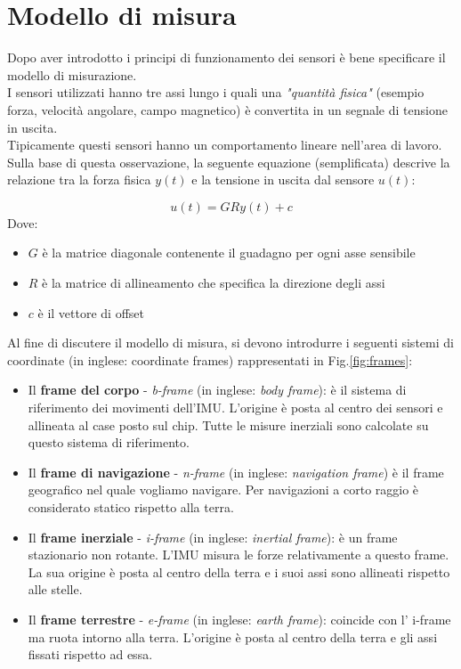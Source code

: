 \section{Modello di misura}
\label{modello_di_misura}
Dopo aver introdotto i principi di funzionamento dei sensori è bene specificare il modello di misurazione.\\
I sensori utilizzati hanno tre assi lungo i quali una \textit{"quantità fisica"} (esempio forza, velocità angolare, campo magnetico) è convertita in un segnale di tensione in uscita. \\
Tipicamente questi sensori hanno un comportamento lineare nell'area di lavoro. Sulla base di questa osservazione, la seguente equazione (semplificata) descrive la relazione tra la forza fisica $y(t)$ e la tensione in uscita dal sensore $ u(t)$:

\begin{equation}
    u(t) = G R y(t) + c
\end{equation}
Dove:
\begin{itemize}
	\item $G$ è la matrice diagonale contenente il guadagno per ogni asse sensibile
	\item $R$ è la matrice di allineamento che specifica la direzione degli assi
	\item $c$ è il vettore di offset 
\end{itemize}
Al fine di discutere il modello di misura, si devono introdurre i seguenti sistemi di coordinate (in inglese: coordinate frames) rappresentati in Fig.\ref{fig:frames}:

\begin{itemize}
	\item Il \textbf{frame del corpo} - \textit{b-frame} (in inglese: \textit{body frame}): è il sistema							 di riferimento dei movimenti dell'IMU. L'origine è posta al centro dei sensori e allineata al case posto sul chip. Tutte le misure inerziali sono calcolate su questo sistema di riferimento.
	\item Il \textbf{frame di navigazione} - \textit{n-frame} (in inglese: \textit{navigation frame}) è il frame geografico nel quale vogliamo navigare. Per navigazioni a corto raggio è considerato statico rispetto alla terra.
	\item Il \textbf{frame inerziale} - \textit{i-frame} (in inglese: \textit{inertial frame}): è un frame stazionario non rotante. L'IMU misura le forze relativamente a questo frame. La sua origine è posta al centro della terra e i suoi assi sono allineati rispetto alle stelle.
	\item Il \textbf{frame terrestre} - \textit{e-frame} (in inglese: \textit{earth frame}): coincide con l' i-frame ma ruota intorno alla terra. L'origine è posta al centro della terra e gli assi fissati rispetto ad essa.
\end{itemize}



